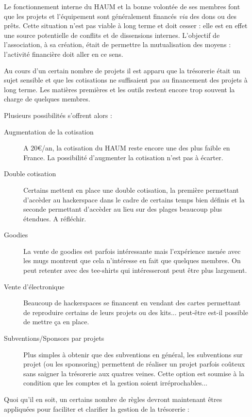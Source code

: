 \documentclass[a4paper, 11pt]{article}
\begin{document}
Le fonctionnement interne du HAUM et la bonne volontée de ses membres font que les projets et l'équipement sont
généralement financés \textit{via} des dons ou des prêts. Cette situation n'est pas viable à long terme et doit cesser :
elle est en effet une source potentielle de conflits et de dissensions internes. L'objectif de l'association, à sa
création, était de permettre la mutualisation des moyens : l'activité financière doit aller en ce sens.

Au cours d'un certain nombre de projets il est apparu que la trésorerie était un sujet sensible et que les cotisations
ne suffisaient pas au financement des projets à long terme. Les matières premières et les outils restent encore trop
souvent la charge de quelques membres.

Plusieurs possibilités s'offrent alors :

\begin{description}
	\item[Augmentation de la cotisation] A 20\euro{}/an, la cotisation du HAUM reste encore une des plus faible en France. La
		possibilité d'augmenter la cotisation n'est pas à écarter.
	\item[Double cotisation] Certains mettent en place une double cotisation, la première permettant d'accèder au
		hackerspace dans le cadre de certains temps bien définis et la seconde permettant d'accèder au lieu sur des
		plages beaucoup plus étendues. A réfléchir.
	\item[Goodies] La vente de goodies est parfois intéressante mais l'expérience menée avec les mugs montrent que cela
		n'intéresse en fait que quelques membres. On peut retenter avec des tee-shirts qui intéresseront peut être plus
		largement.
	\item[Vente d'électronique] Beaucoup de hackerspaces se financent en vendant des cartes permettant de reproduire
		certains de leurs projets ou des kits... peut-être est-il possible de mettre ça en place.
	\item[Subventions/Sponsors par projets] Plus simples à obtenir que des subventions en général, les subventions sur
		projet (ou les sponsoring) permettent de réaliser un projet parfois coûteux sans saigner la trésorerie aux
		quatres veines. Cette option est soumise à la condition que les comptes et la gestion soient
		irréprochables...
\end{description}

Quoi qu'il en soit, un certains nombre de règles devront maintenant êtres appliquées pour faciliter et clarifier la
gestion de la trésorerie :
\end{document}
